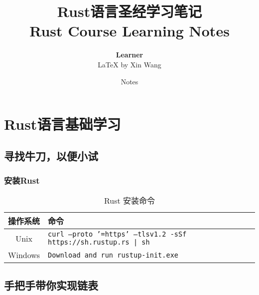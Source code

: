 \documentclass[oneside]{book}
\def\notetitle{Rust语言圣经学习笔记\\Rust Course Learning Notes\cite{Sunface}}
\def\noteauthor{
    \textbf{Learner}\\
    {\LaTeX} by Xin Wang\\
}
\def\notedate{Notes}
\begin{document}
\title{
    \textbf{
        \LARGE{\notetitle} \vspace*{10\baselineskip}
    }
}
\author{\noteauthor}
\date{\notedate}

\maketitle
\newpage

\tableofcontents  %
\listoffigures    %
\listoftables     %
\newpage


\part{\textbf{Rust}语言基础学习}

\chapter{寻找牛刀，以便小试}

\section{安装\textbf{Rust}}{
\begin{table}[h]
\centering
\begin{tabular}{|c|l|}
\hline
操作系统 & 命令 \\
\hline
Unix & \texttt{curl --proto '=https' --tlsv1.2 -sSf https://sh.rustup.rs | sh} \\
\hline
Windows & \texttt{Download and run rustup-init.exe} \\
\hline
\end{tabular}
\caption{Rust 安装命令}
\end{table}
}

\chapter{手把手带你实现链表}
\end{document}

